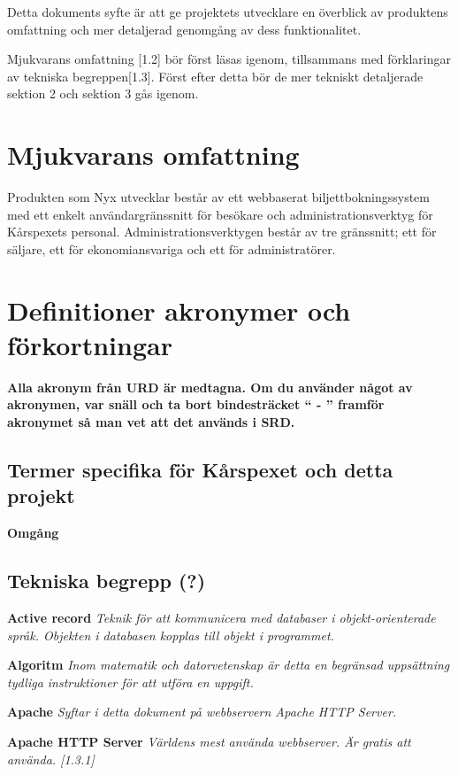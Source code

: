 \documentclass[a4paper, twoside, 11pt, titlepage]{article}
\begin{document}
Detta dokuments syfte är att ge projektets utvecklare en överblick av produktens omfattning och mer detaljerad genomgång av dess funktionalitet.

Mjukvarans omfattning [1.2] bör först läsas igenom, tillsammans med förklaringar av tekniska begreppen[1.3]. Först efter detta bör de mer tekniskt detaljerade sektion 2 och sektion 3 gås igenom.

\clearpage
\section{Mjukvarans omfattning}


Produkten som Nyx utvecklar består av ett webbaserat biljettbokningssystem med ett enkelt användargränssnitt för besökare och administrationsverktyg för Kårspexets personal. Administrationsverktygen består av tre gränssnitt; ett för säljare, ett för ekonomiansvariga och ett för administratörer.

\clearpage
\section{Definitioner akronymer och förkortningar}


\textbf{Alla akronym från URD är medtagna. Om du använder något av akronymen, var snäll och ta bort bindesträcket `` - '' framför akronymet så man vet att det används i SRD.}

	\subsection{Termer specifika för Kårspexet och detta projekt}


	\textbf{Omgång}

	\subsection{Tekniska begrepp (?)}


	\textbf{Active record} \emph{Teknik för att kommunicera med databaser i objekt-orienterade språk. Objekten i databasen kopplas till objekt i programmet.}

	\textbf{Algoritm} \emph{Inom matematik och datorvetenskap är detta en begränsad uppsättning tydliga instruktioner för att utföra en uppgift.}

	\textbf{Apache} \emph{Syftar i detta dokument på webbservern Apache HTTP Server.}

	\textbf{Apache HTTP Server} \emph{Världens mest använda webbserver. Är gratis att använda. [1.3.1]}
\end{document}
